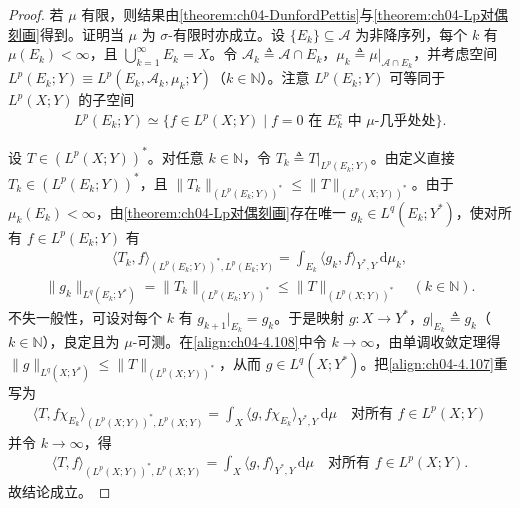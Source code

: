 \documentclass[../../main.tex]{subfiles}%
\begin{document}
\begin{proof}
若 $\mu$ 有限，则结果由\cref{theorem:ch04-DunfordPettis}与\cref{theorem:ch04-Lp对偶刻画}得到。证明当 $\mu$ 为 $\sigma$-有限时亦成立。设 $\{E_k\}\subseteq\mathcal{A}$ 为非降序列，每个 $k$ 有 $\mu(E_k)<\infty$，且 $\bigcup_{k=1}^\infty E_k=X$。令 $\mathcal{A}_k\triangleq \mathcal{A}\cap E_k$，$\mu_k\triangleq \mu|_{\mathcal{A}\cap E_k}$，并考虑空间 $L^p(E_k;Y)\equiv L^p(E_k,\mathcal{A}_k,\mu_k;Y)$（$k\in\mathbb{N}$）。注意 $L^p(E_k;Y)$ 可等同于 $L^p(X;Y)$ 的子空间
\begin{align*}
L^p(E_k;Y)\simeq\{f\in L^p(X;Y)\mid f=0\text{ 在 }E_k^c\text{ 中 }\mu\text{-几乎处处}\}.
\end{align*}

设 $T\in(L^p(X;Y))^*$。对任意 $k\in\mathbb{N}$，令 $T_k\triangleq T|_{L^p(E_k;Y)}$。由定义直接 $T_k\in(L^p(E_k;Y))^*$，且 $\|T_k\|_{(L^p(E_k;Y))^*}\leqslant\|T\|_{(L^p(X;Y))^*}$。由于 $\mu_k(E_k)<\infty$，由\cref{theorem:ch04-Lp对偶刻画}存在唯一 $g_k\in L^q(E_k;Y^*)$，使对所有 $f\in L^p(E_k;Y)$ 有
\begin{align}
\langle T_k,f\rangle_{(L^p(E_k;Y))^*,L^p(E_k;Y)}=\int_{E_k}\langle g_k,f\rangle_{Y^*,Y}\,\mathrm{d}\mu_k, \label{align:ch04-4.107}
\end{align}
\begin{align}
\|g_k\|_{L^q(E_k;Y^*)}=\|T_k\|_{(L^p(E_k;Y))^*}\leqslant\|T\|_{(L^p(X;Y))^*}\quad(k\in\mathbb{N}). \label{align:ch04-4.108}
\end{align}
不失一般性，可设对每个 $k$ 有 $g_{k+1}|_{E_k}=g_k$。于是映射 $g:X\to Y^*$，$g|_{E_k}\triangleq g_k$（$k\in\mathbb{N}$），良定且为 $\mu$-可测。在\eqref{align:ch04-4.108}中令 $k\to\infty$，由单调收敛定理得 $\|g\|_{L^q(X;Y^*)}\leqslant\|T\|_{(L^p(X;Y))^*}$，从而 $g\in L^q(X;Y^*)$。把\eqref{align:ch04-4.107}重写为
\begin{align*}
\langle T,f\chi_{E_k}\rangle_{(L^p(X;Y))^*,L^p(X;Y)}=\int_X\langle g,f\chi_{E_k}\rangle_{Y^*,Y}\,\mathrm{d}\mu\quad\text{对所有 }f\in L^p(X;Y)
\end{align*}
并令 $k\to\infty$，得
\begin{align*}
\langle T,f\rangle_{(L^p(X;Y))^*,L^p(X;Y)}=\int_X\langle g,f\rangle_{Y^*,Y}\,\mathrm{d}\mu\quad\text{对所有 }f\in L^p(X;Y).
\end{align*}
故结论成立。
\end{proof}
\end{document}
